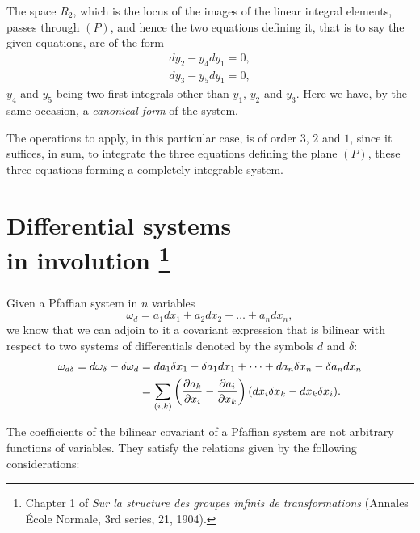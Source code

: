 \documentclass[leqno,11pt]{book}
\newcommand{\pd}{\partial}
\theoremstyle{shape1}
\theoremstyle{shapesmall}
\begin{document}
The space $R_{2}$, which is the locus of the images of the linear integral elements, passes through $(P)$, and hence the two equations defining it, that is to say the given equations, are of the form
\begin{gather*}
  dy_{2}-y_{4}dy_{1}=0,\\
  dy_{3}-y_{5}dy_{1}=0,
\end{gather*}
 $y_{4}$ and $y_{5}$ being two first integrals other than $y_{1}$, $y_{2}$ and $y_{3}$. Here we have, by the same occasion, a \emph{canonical form} of the system.

The operations to apply, in this particular case, is of order $3$, $2$ and $1$, since it suffices, in sum, to integrate the three equations defining the plane $(P)$, these three equations forming a completely integrable system.

\chapter*{Differential systems\\in involution \footnote{Chapter 1 of \emph{Sur la structure des groupes infinis de transformations} (Annales École Normale, 3rd series, 21, 1904).}}
\label{cha:diff-syst-invol}

\setcounter{equation}{0}
\paragraph{}
\label{sec:p1}
Given a Pfaffian system in $n$ variables
\begin{equation}
  \label{eq:p1}
  \omega_{d}=a_{1}dx_{1}+a_{2}dx_{2}+\dots+a_{n}dx_{n},
\end{equation}
we know that we can adjoin to it a covariant expression that is bilinear with respect to two systems of differentials denoted by the symbols $d$ and $\delta$:
\begin{align}
  \label{eq:p2}
  \omega_{d\delta}=d\omega_{\delta}-\delta\omega_{d}&=da_{1}\delta x_{1}-\delta a_{1}dx_{1}+\dots+da_{n}\delta x_{n}-\delta a_{n}dx_{n}\\
  &=\sum_{(i,k)}\left(\frac{\pd a_{k}}{\pd x_{i}}-\frac{\pd a_{i}}{\pd x_{k}}\right)(dx_{i}\delta x_{k}-dx_{k}\delta x_{i}).\notag
\end{align}

The coefficients of the bilinear covariant of a Pfaffian system are not arbitrary functions of variables. They satisfy the relations given by the following considerations:
\end{document}

